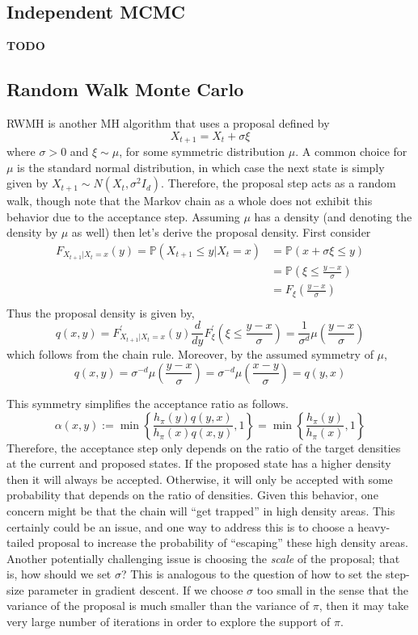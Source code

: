 \documentclass[12pt]{article}
\newcommand{\Prob}{\mathbb{P}}
\begin{document}
\subsection{Independent MCMC}
\textbf{TODO}

\subsection{Random Walk Monte Carlo} 
RWMH is another MH algorithm that uses a proposal defined by
\[X_{t + 1} = X_t + \sigma \xi \]
where $\sigma > 0$ and $\xi \sim \mu$, for some symmetric distribution $\mu$. A common choice for $\mu$ is the standard normal distribution, in which case the next 
state is simply given by $X_{t + 1} \sim N(X_t, \sigma^2 I_d)$. Therefore, the proposal step acts as a random walk, though note that the Markov chain as a whole does not 
exhibit this behavior due to the acceptance step. Assuming $\mu$ has a density (and denoting the density by $\mu$ as well) then let's derive the proposal density. 
First consider
\begin{align*}
F_{X_{t + 1}|X_t=x}(y) = \Prob(X_{t + 1} \leq y|X_t=x) &= \Prob(x + \sigma \xi \leq y) \\
									 	 &= \Prob\left(\xi \leq \frac{y - x}{\sigma}\right) \\
									 	 &= F_{\xi}\left(\frac{y - x}{\sigma}\right) \\
\end{align*}
Thus the proposal density is given by, 
\[q(x, y) = F_{X_{t + 1}|X_t=x}^\prime(y) \frac{d}{dy}F_{\xi}^\prime \left(\xi \leq \frac{y - x}{\sigma}\right) = \frac{1}{\sigma^d}\mu\left(\frac{y - x}{\sigma}\right)\]
which follows from the chain rule. Moreover, by the assumed symmetry of $\mu$, 
\[q(x, y) = \sigma^{-d} \mu\left(\frac{y - x}{\sigma}\right) = \sigma^{-d} \mu\left(\frac{x - y}{\sigma}\right) = q(y, x)\]

This symmetry simplifies the acceptance ratio as follows.  
\[\alpha(x, y) := \min\left\{\frac{h_\pi(y) q(y, x)}{h_\pi(x)q(x, y)}, 1\right\} = \min\left\{\frac{h_\pi(y)}{h_\pi(x)}, 1\right\} \]
Therefore, the acceptance step only depends on the ratio of the target densities at the current and proposed states. If the proposed state has a higher density then it will 
always be accepted. Otherwise, it will only be accepted with some probability that depends on the ratio of densities. Given this behavior, one concern might be that the 
chain will ``get trapped'' in high density areas. This certainly could be an issue, and one way to address this is to choose a heavy-tailed proposal to increase the probability
of ``escaping'' these high density areas. Another potentially challenging issue is choosing the \textit{scale} of the proposal; that is, how should we set $\sigma$? This is 
analogous to the question of how to set the step-size parameter in gradient descent. If we choose $\sigma$ too small in the sense that the variance of the proposal is much 
smaller than the variance of $\pi$, then it may take very large number of iterations in order to explore the support of $\pi$. 
\end{document}
